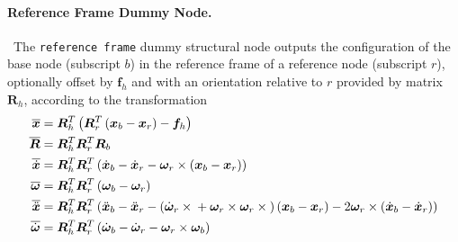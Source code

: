 \documentclass[10pt,dvips,fleqn,subeqn]{report}
\newcommand{\T}[1]{\bm{#1}}
\begin{document}
\paragraph{Reference Frame Dummy Node.} \
The \texttt{reference frame} dummy structural node
outputs the configuration of the base node (subscript $b$)
in the reference frame of a reference node (subscript $r$),
optionally offset by $\T{f}_h$ and with an orientation relative 
to $r$ provided by matrix $\T{R}_h$,
according to the transformation
\begin{subequations}
\begin{align}
	\overline{\T{x}} &= \T{R}_h^T \plbr{\T{R}_r^T \plbr{\T{x}_b - \T{x}_r} - \T{f}_h}\\
	\overline{\T{R}} &= \T{R}_h^T \T{R}_r^T \T{R}_b \\
	\overline{\dot{\T{x}}} &= \T{R}_h^T \T{R}_r^T \plbr{
		\dot{\T{x}}_b
		- \dot{\T{x}}_r
		- \T{\omega}_r\times\plbr{\T{x}_b - \T{x}_r}
	} \\
	\overline{\T{\omega}} &= \T{R}_h^T \T{R}_r^T \plbr{\T{\omega}_b - \T{\omega}_r} \\
	\overline{\ddot{\T{x}}} &= \T{R}_h^T \T{R}_r^T \plbr{
		\ddot{\T{x}}_b
		- \ddot{\T{x}}_r
		- \plbr{
			\dot{\T{\omega}}_r \times{}
			+ \T{\omega}_r \times \T{\omega}_r \times{}
		} \plbr{\T{x}_b - \T{x}_r}
		- 2 \T{\omega}_r \times \plbr{\dot{\T{x}}_b - \dot{\T{x}}_r}
	} \\
	\overline{\dot{\T{\omega}}} &= \T{R}_h^T \T{R}_r^T \plbr{
		\dot{\T{\omega}}_b
		- \dot{\T{\omega}}_r
		- \T{\omega}_r \times \T{\omega}_b
	}
\end{align}
\end{subequations}
\end{document}
